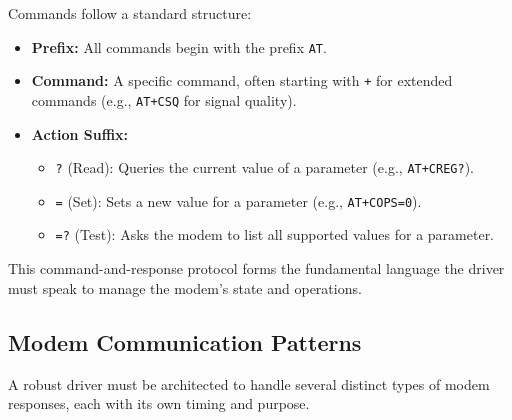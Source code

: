 Commands follow a standard structure:
\begin{itemize}
    \item \textbf{Prefix:} All commands begin with the prefix \texttt{AT}.
    \item \textbf{Command:} A specific command, often starting with \texttt{+} for extended commands (e.g., \texttt{AT+CSQ} for signal quality).
    \item \textbf{Action Suffix:}
    \begin{itemize}
        \item \texttt{?} (Read): Queries the current value of a parameter (e.g., \texttt{AT+CREG?}).
        \item \texttt{=} (Set): Sets a new value for a parameter (e.g., \texttt{AT+COPS=0}).
        \item \texttt{=?} (Test): Asks the modem to list all supported values for a parameter.
    \end{itemize}
\end{itemize}
This command-and-response protocol forms the fundamental language the driver must speak to manage the modem's state and operations.

\subsection{Modem Communication Patterns}
A robust driver must be architected to handle several distinct types of modem responses, each with its own timing and purpose.

